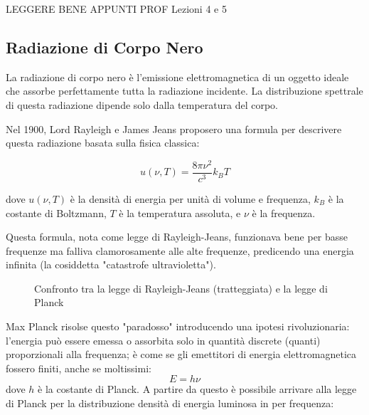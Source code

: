 LEGGERE BENE APPUNTI PROF Lezioni 4 e 5

\subsection{Radiazione di Corpo Nero} 
La radiazione di corpo nero è l'emissione elettromagnetica di un oggetto ideale che assorbe perfettamente tutta la radiazione incidente. La distribuzione spettrale di questa radiazione dipende solo dalla temperatura del corpo.

Nel 1900, Lord Rayleigh e James Jeans proposero una formula per descrivere questa radiazione basata sulla fisica classica:

\[
	u(\nu,T) = \frac{8\pi\nu^2}{c^3}k_BT
\]

dove $u(\nu,T)$ è la densità di energia per unità di volume e frequenza, $k_B$ è la costante di Boltzmann, $T$ è la temperatura assoluta, e $\nu$ è la frequenza.

Questa formula, nota come legge di Rayleigh-Jeans, funzionava bene per basse frequenze ma falliva clamorosamente alle alte frequenze, predicendo una energia infinita (la cosiddetta "catastrofe ultravioletta").

\usetikzlibrary{math}

\begin{figure}[h]
\centering
{}
\caption{Confronto tra la legge di Rayleigh-Jeans (tratteggiata) e la legge di Planck}
\end{figure}


Max Planck risolse questo "paradosso" introducendo una ipotesi rivoluzionaria: l'energia può essere emessa o assorbita solo in quantità discrete (quanti) proporzionali alla frequenza; è come se gli emettitori di energia elettromagnetica fossero finiti, anche se moltissimi:
\[
	E = h\nu
\]
dove $h$ è la costante di Planck. A partire da questo è possibile arrivare alla legge di Planck per la distribuzione densità di energia luminosa in per frequenza:

